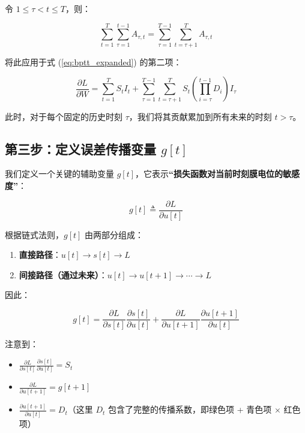 \documentclass[journal,12pt,onecolumn]{IEEEtran}
\begin{document}
令 \(1 \le \tau < t \le T\)，则：

\begin{equation}
\sum_{t=1}^T \sum_{\tau=1}^{t-1} A_{\tau,t}
=
\sum_{\tau=1}^{T-1} \sum_{t=\tau+1}^{T} A_{\tau,t}
\end{equation}

将此应用于式 (\ref{eq:bptt_expanded}) 的第二项：

\begin{equation}
\frac{\partial L}{\partial W}
=
\sum_{t=1}^T S_t I_t
+
\sum_{\tau=1}^{T-1} \sum_{t=\tau+1}^{T}
S_t \left( \prod_{i=\tau}^{t-1} D_i \right) I_\tau
\label{eq:bptt_swapped}
\end{equation}

此时，对于每个固定的历史时刻 \(\tau\)，我们将其贡献累加到所有未来的时刻 \(t > \tau\)。

\subsection{第三步：定义误差传播变量 \(g[t]\)}

我们定义一个关键的辅助变量 \(g[t]\)，它表示\textbf{“损失函数对当前时刻膜电位的敏感度”}：

\begin{equation}
g[t] \triangleq \frac{\partial L}{\partial u[t]}
\label{eq:g_def}
\end{equation}

根据链式法则，\(g[t]\) 由两部分组成：

\begin{enumerate}
    \item \textbf{直接路径}：\(u[t] \to s[t] \to L\)
    \item \textbf{间接路径（通过未来）}：\(u[t] \to u[t+1] \to \cdots \to L\)
\end{enumerate}

因此：

\begin{equation}
g[t] = 
\frac{\partial L}{\partial s[t]} \frac{\partial s[t]}{\partial u[t]}
+
\frac{\partial L}{\partial u[t+1]} \frac{\partial u[t+1]}{\partial u[t]}
\label{eq:g_chain}
\end{equation}

注意到：
\begin{itemize}
    \item \(\frac{\partial L}{\partial s[t]} \frac{\partial s[t]}{\partial u[t]} = S_t\)
    \item \(\frac{\partial L}{\partial u[t+1]} = g[t+1]\)
    \item \(\frac{\partial u[t+1]}{\partial u[t]} = D_t\)（这里 \(D_t\) 包含了完整的传播系数，即绿色项 + 青色项 × 红色项）
\end{itemize}
\end{document}
